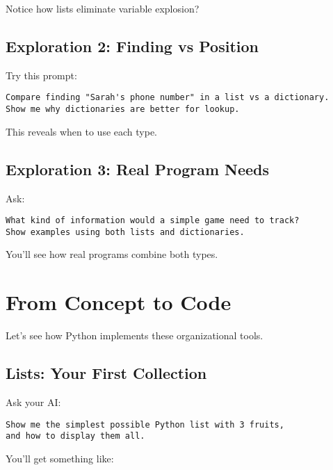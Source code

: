\documentclass[
  letterpaper,
  DIV=11,
  numbers=noendperiod,
  oneside]{scrreprt}
\begin{document}
Notice how lists eliminate variable explosion?

\subsection{Exploration 2: Finding vs
Position}\label{exploration-2-finding-vs-position}

Try this prompt:

\begin{verbatim}
Compare finding "Sarah's phone number" in a list vs a dictionary. 
Show me why dictionaries are better for lookup.
\end{verbatim}

This reveals when to use each type.

\subsection{Exploration 3: Real Program
Needs}\label{exploration-3-real-program-needs}

Ask:

\begin{verbatim}
What kind of information would a simple game need to track? 
Show examples using both lists and dictionaries.
\end{verbatim}

You'll see how real programs combine both types.

\section{From Concept to Code}\label{from-concept-to-code-6}

Let's see how Python implements these organizational tools.

\subsection{Lists: Your First
Collection}\label{lists-your-first-collection}

Ask your AI:

\begin{verbatim}
Show me the simplest possible Python list with 3 fruits, 
and how to display them all.
\end{verbatim}

You'll get something like:
\end{document}
